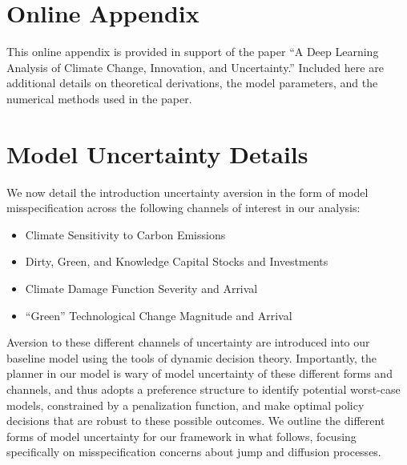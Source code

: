 \documentclass[12pt]{article}
\newcommand{\mb}[1]{\textcolor{blue}{\textsf{[MDB: #1]}}}
\begin{document}
\begin{appendices}

\section*{Online Appendix}


This online appendix is provided in support of the paper ``A Deep Learning Analysis of Climate Change, Innovation, and Uncertainty.'' Included here are additional details on theoretical derivations, the model parameters, and the numerical methods used in the paper.

\section{Model Uncertainty Details}\label{app:UncertaintyHJB}

We now detail the introduction uncertainty aversion in the form of model misspecification across the following channels of interest in our analysis: 

\begin{itemize}
\item Climate Sensitivity to Carbon Emissions
\vspace{0.1cm}
\item Dirty, Green, and Knowledge Capital Stocks and Investments
\vspace{0.1cm}
\item Climate Damage Function Severity and Arrival
\vspace{0.1cm}
\item ``Green'' Technological Change Magnitude and Arrival
\end{itemize}


Aversion to these different channels of uncertainty are introduced into our baseline model using the tools of dynamic decision theory. Importantly, the planner in our model is wary of model uncertainty of these different forms and channels, and thus adopts a preference structure to identify potential worst-case models, constrained by a penalization function, and make optimal policy decisions that are robust to these possible outcomes. We outline the different forms of model uncertainty for our framework in what follows, focusing specifically on misspecification concerns about jump and diffusion processes. 


\end{appendices}
\end{document}
